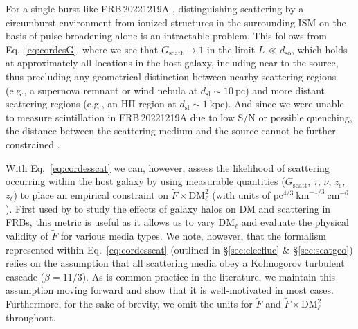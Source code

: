 \documentclass[twocolumn, linenumbers, tra]{aastex631}
\newcommand{\nihari}{FRB\,20221219A } %
\begin{document}
{For a single burst like \nihari, distinguishing scattering by a circumburst environment from ionized structures in the surrounding ISM on the basis of pulse broadening alone is an intractable problem. This follows from Eq.~\ref{eq:cordesG}, where we see that $G_{\mathrm{scatt}} \rightarrow 1$ in the limit $L \ll d_{\mathrm{so}}$, which holds at approximately all locations in the host galaxy, including near to the source, thus precluding any geometrical distinction between nearby scattering regions (e.g., a supernova remnant or wind nebula at $d_{\mathrm{sl}} \sim 10\ \mathrm{pc}$) and more distant scattering regions (e.g., an HII region at $d_{\mathrm{sl}} \sim 1\ \mathrm{kpc}$). And since we were unable to measure scintillation in \nihari due to low S/N or possible quenching, the distance between the scattering medium and the source cannot be further constrained \citep[e.g., with a two-screen scattering model;][]{Masui2015, Ocker2022a, Sammons2023}. 

With Eq.~\ref{eq:cordesscat} we can, however, assess the likelihood of scattering occurring within the host galaxy by using measurable quantities ($G_{\mathrm{scatt}}$, $\tau$, $\nu$, $z_{\mathrm{s}}$, $z_{\ell}$) to place an empirical constraint on $\widetilde{F} \times \mathrm{DM}_{\ell}^{2}$ (with units of $\mathrm{pc}^{4/3}\mathrm{\ km}^{-1/3} \mathrm{\ cm}^{-6}$). First used by \citet{Ocker2021} to study the effects of galaxy halos on DM and scattering in FRBs, this metric is useful as it allows us to vary $\mathrm{DM}_{\ell}$ and evaluate the physical validity of $\widetilde{F}$ for various media types. We note, however, that the formalism represented within Eq.~\ref{eq:cordesscat} (outlined in \S\ref{sec:elecfluc} \& \S\ref{sec:scatgeo}) relies on the assumption that all scattering media obey a Kolmogorov turbulent cascade ($\beta = 11/3$). As is common practice in the literature, we maintain this assumption moving forward and show that it is well-motivated in most cases. Furthermore, for the sake of brevity, we omit the units for $\widetilde{F}$ and $\widetilde{F} \times \mathrm{DM}_{\ell}^{2}$ throughout. 

}
\end{document}
